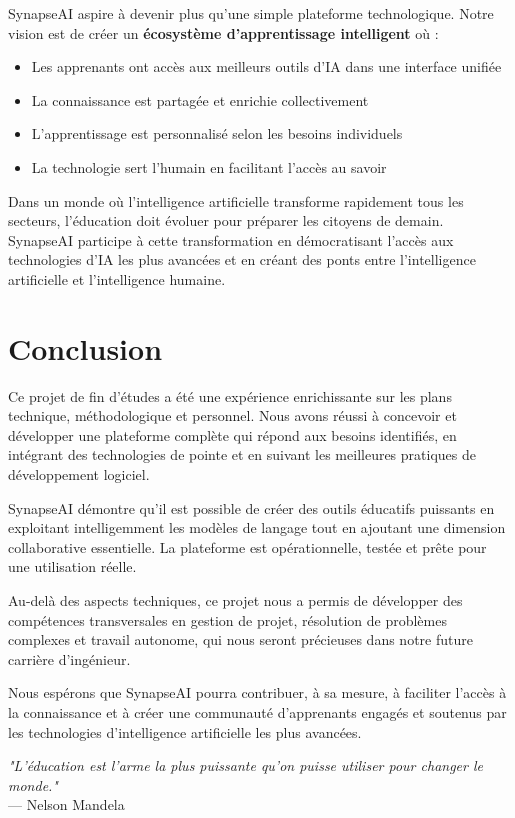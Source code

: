 SynapseAI aspire à devenir plus qu'une simple plateforme technologique. Notre vision est de créer un \textbf{écosystème d'apprentissage intelligent} où :

\begin{itemize}
    \item Les apprenants ont accès aux meilleurs outils d'IA dans une interface unifiée
    \item La connaissance est partagée et enrichie collectivement
    \item L'apprentissage est personnalisé selon les besoins individuels
    \item La technologie sert l'humain en facilitant l'accès au savoir
\end{itemize}

Dans un monde où l'intelligence artificielle transforme rapidement tous les secteurs, l'éducation doit évoluer pour préparer les citoyens de demain. SynapseAI participe à cette transformation en démocratisant l'accès aux technologies d'IA les plus avancées et en créant des ponts entre l'intelligence artificielle et l'intelligence humaine.

\section*{Conclusion}

Ce projet de fin d'études a été une expérience enrichissante sur les plans technique, méthodologique et personnel. Nous avons réussi à concevoir et développer une plateforme complète qui répond aux besoins identifiés, en intégrant des technologies de pointe et en suivant les meilleures pratiques de développement logiciel.

SynapseAI démontre qu'il est possible de créer des outils éducatifs puissants en exploitant intelligemment les modèles de langage tout en ajoutant une dimension collaborative essentielle. La plateforme est opérationnelle, testée et prête pour une utilisation réelle.

Au-delà des aspects techniques, ce projet nous a permis de développer des compétences transversales en gestion de projet, résolution de problèmes complexes et travail autonome, qui nous seront précieuses dans notre future carrière d'ingénieur.

Nous espérons que SynapseAI pourra contribuer, à sa mesure, à faciliter l'accès à la connaissance et à créer une communauté d'apprenants engagés et soutenus par les technologies d'intelligence artificielle les plus avancées.

\vspace{2cm}

\textit{"L'éducation est l'arme la plus puissante qu'on puisse utiliser pour changer le monde."} \\
\hspace*{10cm} --- Nelson Mandela

